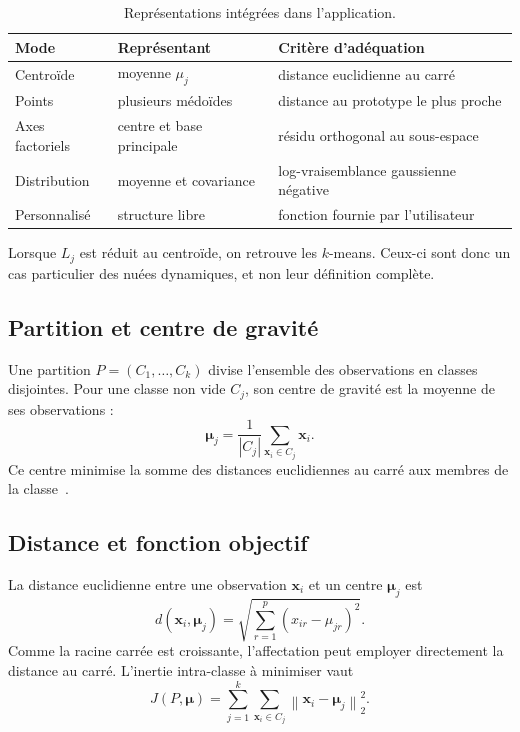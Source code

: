 \documentclass[12pt,a4paper]{article}
\begin{document}
\begin{table}[H]
\centering
\caption{Représentations intégrées dans l'application.}
\begin{tabular}{p{3cm}p{4cm}p{5.2cm}}
\toprule
Mode & Représentant & Critère d'adéquation\\
\midrule
Centroïde & moyenne $\mu_j$ & distance euclidienne au carré\\
Points & plusieurs médoïdes & distance au prototype le plus proche\\
Axes factoriels & centre et base principale & résidu orthogonal au sous-espace\\
Distribution & moyenne et covariance & log-vraisemblance gaussienne négative\\
Personnalisé & structure libre & fonction fournie par l'utilisateur\\
\bottomrule
\end{tabular}
\end{table}

Lorsque $L_j$ est réduit au centroïde, on retrouve les $k$-means. Ceux-ci sont
donc un cas particulier des nuées dynamiques, et non leur définition complète.

\subsection{Partition et centre de gravité}
Une partition $P=(C_1,\ldots,C_k)$ divise l'ensemble des observations en
classes disjointes. Pour une classe non vide $C_j$, son centre de gravité est
la moyenne de ses observations :
\begin{equation}
  \boldsymbol{\mu}_j=\frac{1}{|C_j|}\sum_{\mathbf{x}_i\in C_j}\mathbf{x}_i.
\end{equation}
Ce centre minimise la somme des distances euclidiennes au carré aux membres de
la classe~\cite{hastie2009}.

\subsection{Distance et fonction objectif}
La distance euclidienne entre une observation $\mathbf{x}_i$ et un centre
$\boldsymbol{\mu}_j$ est
\begin{equation}
 d(\mathbf{x}_i,\boldsymbol{\mu}_j)=
 \sqrt{\sum_{r=1}^{p}(x_{ir}-\mu_{jr})^2}.
\end{equation}
Comme la racine carrée est croissante, l'affectation peut employer directement
la distance au carré. L'inertie intra-classe à minimiser vaut
\begin{equation}\label{eq:objectif}
 J(P,\boldsymbol{\mu})=\sum_{j=1}^{k}\sum_{\mathbf{x}_i\in C_j}
 \left\|\mathbf{x}_i-\boldsymbol{\mu}_j\right\|_2^2.
\end{equation}
\end{document}
